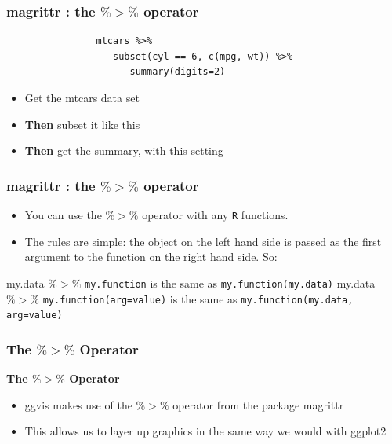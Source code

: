 \documentclass[MASTER.tex]{subfiles}
\begin{document}
		\begin{frame}[fragile]
			\frametitle{magrittr :  the $\%>\%$ operator}
			\Large
			\begin{framed}
				\begin{verbatim}	
				mtcars %>% 
				   subset(cyl == 6, c(mpg, wt)) %>% 
				      summary(digits=2)
				\end{verbatim}
			\end{framed}
			\begin{itemize}
				\item Get the mtcars data set
				\item \textbf{Then} subset it like this
				\item \textbf{Then} get the summary, with this setting
			\end{itemize}
			\end{frame}
	\begin{frame}
		\frametitle{magrittr :  the $\%>\%$ operator}
		\begin{itemize}
			\item You can use the $\%>\%$ operator with any \texttt{R} functions.
			\item The rules are simple: the object on the left hand side is passed as the first argument to the function on the right hand side. So: 
		\end{itemize}
		\begin{framed}	
			my.data $\%>\%$ \texttt{my.function} is the same as \texttt{my.function(my.data)}
			my.data $\%>\%$ \texttt{my.function(arg=value)} is the same as \texttt{my.function(my.data, arg=value)}
		\end{framed}
		
	\end{frame}
	\begin{frame}[fragile]
		\frametitle{The $ \%>\% $ Operator}
		\Large
		\textbf{The $ \%>\% $ Operator}
		\begin{itemize}
			\item ggvis makes use of the $ \%>\% $ operator from the
			package magrittr
			\item This allows us to layer up graphics in the same
			way we would with ggplot2
			
		\end{itemize}
		
		
	\end{frame}
\end{document}
